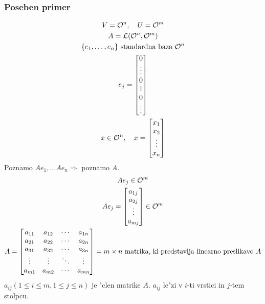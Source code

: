 \subsubsection{Poseben primer}
\begin{gather*}
V = \mathcal{O}^n ,\quad U = \mathcal{O}^m \\
A = \mathcal{L}(\mathcal{O}^n, \mathcal{O}^m) \\
\{e_1, \ldots, e_n\} \text{ standardna baza $\mathcal{O}^n$} \\
e_j = \begin{bmatrix}
0 \\ \vdots \\ 0 \\ 1 \\ 0 \\ \vdots
\end{bmatrix} \\
x \in \mathcal{O}^n, \quad x = \begin{bmatrix}
x_1 \\ x_2 \\ \vdots \\ x_n
\end{bmatrix}
\end{gather*}
Poznamo $Ae_1, \ldots Ae_n \Rightarrow$ poznamo $A$.
\begin{gather*}
Ae_j \in \mathcal{O}^m \\
Ae_j = \begin{bmatrix}
a_{1j} \\ a_{2j} \\ \vdots \\ a_{mj}
\end{bmatrix} \in \mathcal{O}^m \\
A = \begin{bmatrix}
a_{11} & a_{12} & \cdots & a_{1n} \\
a_{21} & a_{22} & \cdots & a_{2n} \\
a_{31} & a_{32} & \cdots & a_{3n} \\
\vdots & \vdots & \ddots & \vdots \\
a_{m1} & a_{m2} & \cdots & a_{mn}
\end{bmatrix} = \text{$m \times n$ matrika, ki predstavlja linearno preslikavo $A$}
\end{gather*}
$a_{ij} (1 \leq i \leq m, 1 \leq j \leq n)$ je "clen matrike $A$. $a_{ij}$ le"zi v $i$-ti vrstici in $j$-tem stolpcu.

